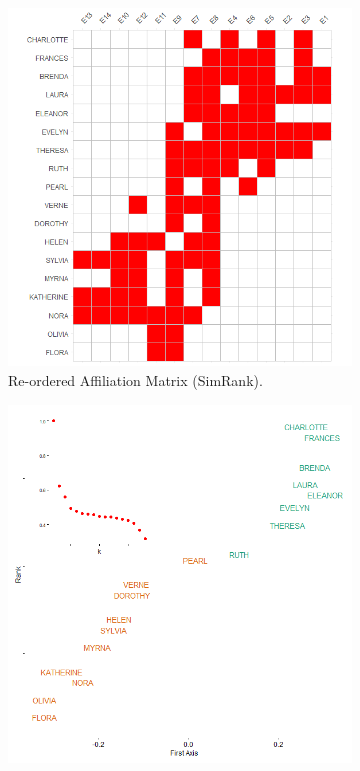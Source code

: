 \documentclass[a4paper,fleqn]{cas-sc}
\begin{document}
\begin{figure}
    \captionsetup[subfigure]{font=footnotesize,labelfont=footnotesize}
    \centering
     \begin{subfigure}[b]{0.35\textwidth}
        \includegraphics[width=1.0\textwidth]{Plots/sr-plot-reord.png}
            \caption{Re-ordered Affiliation Matrix (SimRank).}
            \label{fig:p-bon-sim}
    \end{subfigure}
     \begin{subfigure}[b]{0.3\textwidth}
        \includegraphics[width=1.0\textwidth]{Plots/p-sr-plot-eigen.png}

\end{subfigure}
\end{figure}
\end{document}
